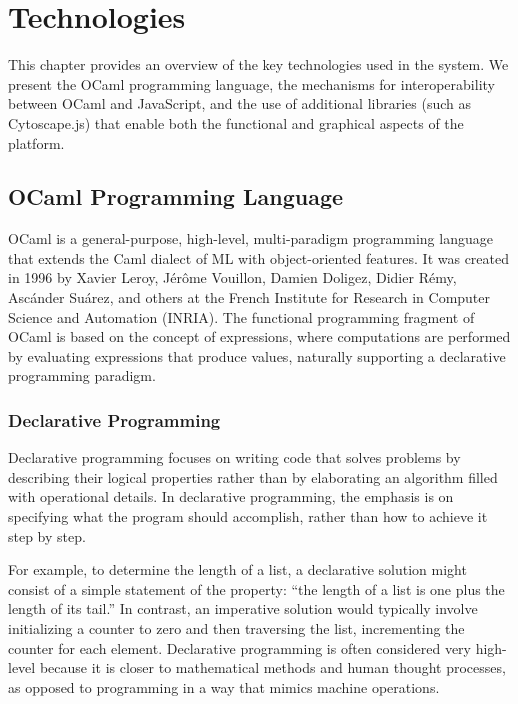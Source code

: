 
%

\chapter{Technologies}
\label{cha:technologies}

This chapter provides an overview of the key technologies used in the system. We present
the OCaml programming language, the mechanisms for interoperability between OCaml and JavaScript, 
and the use of additional libraries (such as Cytoscape.js) that enable both the functional and graphical aspects of
the platform.

\section{OCaml Programming Language}

OCaml is a general-purpose, high-level, multi-paradigm programming language that
extends the Caml dialect of ML with object-oriented features. It was created in 1996 by
Xavier Leroy, Jérôme Vouillon, Damien Doligez, Didier Rémy, Ascánder Suárez, and others
at the French Institute for Research in Computer Science and Automation (INRIA). The
functional programming fragment of OCaml is based on the concept of expressions, where
computations are performed by evaluating expressions that produce values, naturally
supporting a declarative programming paradigm. \cite{ocaml_about}

\subsection{Declarative Programming}

Declarative programming focuses on writing code that solves problems by describing their logical properties rather than by elaborating an algorithm filled with operational details. 
In declarative programming\cite{declarative-programming}, the emphasis is on specifying what the program should accomplish, rather than how to achieve it step by step.

For example, to determine the length of a list, a declarative solution might consist of a simple statement of the property: “the length of a list is one plus the length of its tail.” 
In contrast, an imperative solution would typically involve initializing a counter to zero and then traversing the list, incrementing the counter for each element.
Declarative programming is often considered very high-level because it is closer to mathematical methods and human thought processes, 
as opposed to programming in a way that mimics machine operations.

